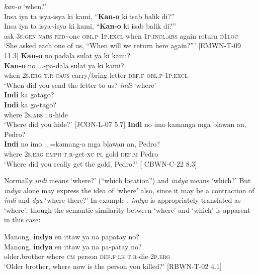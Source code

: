 \ea
\textit{kan-o} ‘when?’ \\
Insa  iya  ta  isya-isya  ki  kami,  “\textbf{Kan-o}  ki  isab   balik  di?” \\\smallskip
\gll Insa  iya  ta  isya\sim isya  ki  kami,  “\textbf{Kan-o}  ki  isab  balik  di?” \\
ask  3\textsc{s.gen}  \textsc{nabs}  \textsc{red}\sim{}one  \textsc{obl.p}  1\textsc{p.excl}  when  1\textsc{p.incl.abs}  again  return  \textsc{d}1\textsc{loc} \\
\glt ‘She asked each one of us, “When will we return here again?”' [EMWN-T-09 11.3]
\z
\ea
\textbf{Kan-o}  no   padaļa  suļat  ya  ki  kami? \\\smallskip
\gll \textbf{Kan-o}  no   ...-pa-daļa  suļat  ya  ki  kami? \\
when  2\textsc{s.erg}  \textsc{t.r}-\textsc{caus}-carry/bring  letter  \textsc{def.f}  \textsc{obl.p}  1\textsc{p.excl} \\
\glt ‘When did you send the letter to us?
\z
\ea
\textit{indi} ‘where’ \\
\textbf{Indi}  ka  gatago? \\\smallskip
\gll \textbf{Indi}  ka  ga-tago? \\
where  2\textsc{s.abs}  \textsc{i.r}-hide \\
\glt ‘Where did you hide?’ [JCON-L-07 5.7]
\z
\ea
\textbf{Indi}  no  imo  kamanga  mga  bļawan  an,  Pedro? \\\smallskip
\gll \textbf{Indi}  no  imo  ...=kamang-a  mga  bļawan  an,  Pedro? \\
where  2\textsc{s.erg}  \textsc{emph}  \textsc{t.r}-get-\textsc{xc}  \textsc{pl}  gold  \textsc{def.m}  Pedro \\
\glt ‘Where did you really get the gold, Pedro?' [ CBWN-C-22 8.3]
\z

Normally \textit{indi} means ‘where?’ (“which location”) and \textit{indya} means ‘which?’ But \textit{indya} alone may express the idea of ‘where’ also, since it may be a contraction of \textit{indi} and \textit{dya} ‘where there?’ In example , \textit{indya} is appropriately translated as ‘where’, though the semantic similarity between ‘where’ and ‘which’ is apparent in this case:

\ea
\label{bkm:Ref113884250}
Manong,  \textbf{indya}  en  ittaw  ya  na  papatay  no? \\\smallskip
\gll Manong,  \textbf{indya}  en  ittaw  ya  na  pa-patay  no? \\
older.brother  where  \textsc{cm}  person  \textsc{def.f}  \textsc{lk}  \textsc{t.r}-die  2\textsc{p.erg} \\
\glt ‘Older brother, where now is the person you killed?’ [RBWN-T-02 4.1]
\z

